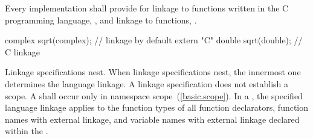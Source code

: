 \pnum
{}%
Every implementation shall provide for linkage to functions written in
the C programming language,
%
, and linkage to \Cpp functions, .
\begin{example}

\begin{codeblock}
complex sqrt(complex);          // \Cpp linkage by default
extern "C" {
  double sqrt(double);          // C linkage
}
\end{codeblock}
\end{example}

\pnum
{}%
Linkage specifications nest. When linkage specifications nest, the
innermost one determines the language linkage. A linkage specification
does not establish a scope. A  shall
occur only in namespace scope~(\ref{basic.scope}). In a
, the specified language linkage applies
to the function types of all function declarators, function names with
external linkage, and variable names with external linkage declared
within the .

